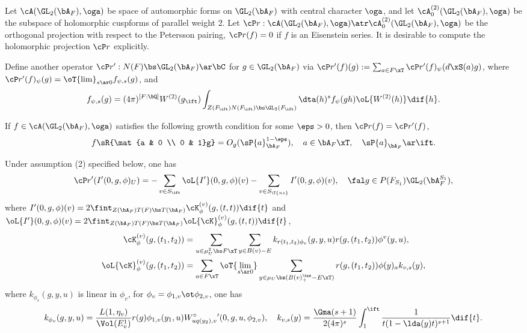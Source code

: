 \documentclass[article, a4paper, twoside]{universal}
\begin{document}
\begin{stp}
    Let $\cA(\GL_{2}(\bA_{F}),\oga)$ be space of automorphic forms on $\GL_{2}(\bA_{F})$ with central character $\oga$, and let $\cA_{0}^{(2)}(\GL_{2}(\bA_{F}),\oga)$ be the subspace of holomorphic cuspforms of parallel weight $2$. Let $\cP r:\cA(\GL_{2}(\bA_{F}),\oga)\atr\cA_{0}^{(2)}(\GL_{2}(\bA_{F}),\oga)$ be the orthogonal projection with respect to the Petersson pairing, $\cP r(f)=0$ if $f$ is an Eisenstein series. It is desirable to compute the holomorphic projection $\cP r$ explicitly.
\end{stp}


\begin{thm}
    Define another operator $\cP r':N(F)\bs\GL_{2}(\bA_{F})\ar\bC$ for $g\in\GL_{2}(\bA_{F})$ via $\cP r'(f)(g):=\sum_{a\in F\xT}\cP r'(f)_{\psi}(d\xS(a)g)$, where $\cP r'(f)_{\psi}(g)=\oT{\lim}_{s\ar 0}f_{\psi,s}(g)$, and
    \[
        f_{\psi,s}(g)=(4\pi)^{[F:\bQ]}W^{(2)}(g_{\ift})\int_{Z(F_{\ift})N(F_{\ift})\bs\GL_{2}(F_{\ift})}\dta(h)^{s}f_{\psi}(gh)\oL{W^{(2)}(h)}\dif{h}.
    \]

    If $f\in\cA(\GL_{2}(\bA_{F}),\oga)$ satisfies the following growth condition for some $\eps>0$, then $\cP r(f)=\cP r'(f)$,
    \[
        f\sR{\mat{a & 0 \\ 0 & 1}g}=O_{g}(\sP{a}_{\bA_{F}}^{1-\eps}),\quad a\in\bA_{F}\xT,\quad \sP{a}_{\bA_{F}}\ar\ift.
    \]
\end{thm}

\begin{thm}\label{thm:analytic-kernel-projection}
    Under assumption (2) specified below, one has
    \[
        \cP r'(I'(0,g,\phi)_{U})=-\sum_{v\in S_{\ift}}\oL{I'}(0,g,\phi)(v)-\sum_{v\in S_{\T{ns}}}I'(0,g,\phi)(v),\quad \fal g\in P(F_{S_{1}})\GL_{2}(\bA_{F}^{S_{1}}),
    \]
    where $I'(0,g,\phi)(v)=2\fint_{Z(\bA_{F})T(F)\bs T(\bA_{F})}\cK_{\phi}^{(v)}(g,(t,t))\dif{t}$ and $\oL{I'}(0,g,\phi)(v)=2\fint_{Z(\bA_{F})T(F)\bs T(\bA_{F})}\oL{\cK}_{\phi}^{(v)}(g,(t,t))\dif{t}$,
    \begin{align*}
      \cK_{\phi}^{(v)}(g,(t_{1},t_{2}))&=\sum_{u\in\mu_{U}^{2}\bs F\xT}\sum_{y\in B(v)-E}k_{r(t_{1},t_{2})\phi_{v}}(g,y,u)r(g,(t_{1},t_{2}))\phi^{v}(y,u),\\
      \oL{\cK}_{\phi}^{(v)}(g,(t_{1},t_{2}))&=\sum_{a\in F\xT}\oT{\lim\limits_{s\ar 0}}\sum_{y\in \mu_{U}\bs(B(v)_{+}^{\tms}-E\xT)}r(g,(t_{1},t_{2}))\phi(y)_{a}k_{v,s}(y),
    \end{align*}
    where $k_{\phi_{v}}(g,y,u)$ is linear in $\phi_{v}$, for $\phi_{v}=\phi_{1,v}\ot\phi_{2,v}$, one has
    \[
        k_{\phi_{v}}(g,y,u)=\frac{L(1,\eta_{v})}{\Vol(E_{v}^{1})}r(g)\phi_{1,v}(y_{1},u)W_{uq(y_{2}),v}^{\circ}{}'(0,g,u,\phi_{2,v}), \quad k_{v,s}(y)=\frac{\Gma(s+1)}{2(4\pi)^{s}}\int_{1}^{\ift}\frac{1}{t(1-\lda(y)t)^{s+1}}\dif{t}.
    \]
\end{thm}
\end{document}
